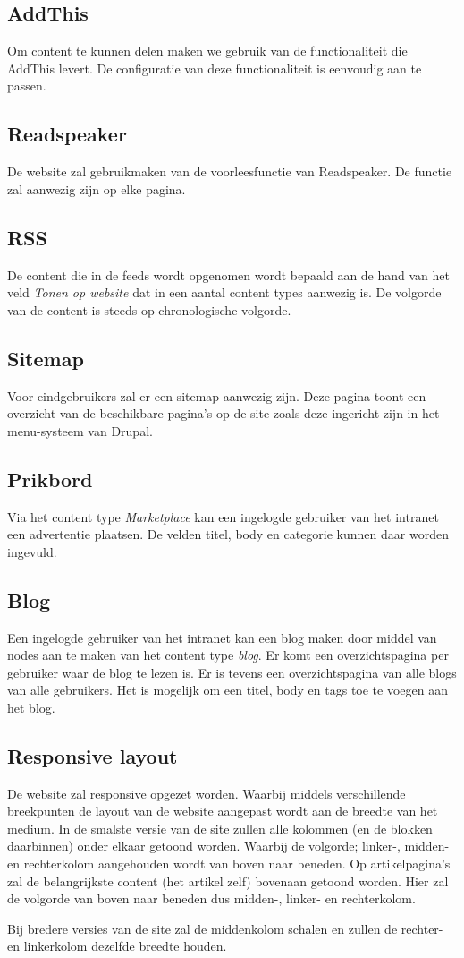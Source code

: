 \subsection{AddThis}
Om content te kunnen delen maken we gebruik van de functionaliteit die AddThis levert. De configuratie van deze functionaliteit is eenvoudig aan te passen.

\subsection{Readspeaker}
De website zal gebruikmaken van de voorleesfunctie van Readspeaker. De functie zal aanwezig zijn op elke pagina.

\subsection{RSS}
De content die in de feeds wordt opgenomen wordt bepaald aan de hand van het veld \emph{Tonen op website} dat in een aantal content types aanwezig is. De volgorde van de content is steeds op chronologische volgorde.

\subsection{Sitemap}
Voor eindgebruikers zal er een sitemap aanwezig zijn. Deze pagina toont een overzicht van de beschikbare pagina's op de site zoals deze ingericht zijn in het menu-systeem van Drupal.

\subsection{Prikbord}
Via het content type \emph{Marketplace} kan een ingelogde gebruiker van het intranet een advertentie plaatsen. De velden titel, body en categorie kunnen daar worden ingevuld. 

\subsection{Blog}
Een ingelogde gebruiker van het intranet kan een blog maken door middel van nodes aan te maken van het content type \emph{blog}. Er komt een overzichtspagina per gebruiker waar de blog te lezen is. Er is tevens een overzichtspagina van alle blogs van alle gebruikers. Het is mogelijk om een titel, body en tags toe te voegen aan het blog.

\subsection{Responsive layout}
De website zal responsive opgezet worden. Waarbij middels verschillende breekpunten de layout van de website aangepast wordt aan de breedte van het medium. In de smalste versie van de site zullen alle kolommen (en de blokken daarbinnen) onder elkaar getoond worden. Waarbij de volgorde; linker-, midden- en rechterkolom aangehouden wordt van boven naar beneden. Op artikelpagina's zal de belangrijkste content (het artikel zelf) bovenaan getoond worden. Hier zal de volgorde van boven naar beneden dus midden-, linker- en rechterkolom.

Bij bredere versies van de site zal de middenkolom schalen en zullen de rechter- en linkerkolom dezelfde breedte houden.